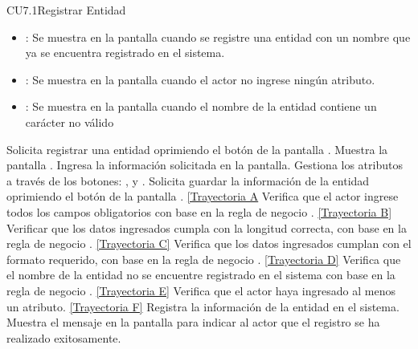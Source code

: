 \begin{UseCase}{CU7.1}{Registrar Entidad}
{\begin{itemize}
		\item {}: Se muestra en la pantalla  cuando se registre una entidad con un nombre que ya se encuentra registrado en el sistema.
		\item {}: Se muestra en la pantalla  cuando el actor no ingrese ningún atributo.
		\item {}: Se muestra en la pantalla  cuando el nombre de la entidad contiene un carácter no válido
		\end{itemize}
		}
	\end{UseCase}
	\begin{UCtrayectoria}
		\UCpaso[\UCactor] Solicita registrar una entidad oprimiendo el botón  de la pantalla .
		\UCpaso[\UCsist] Muestra la pantalla .
		\UCpaso[\UCactor] Ingresa la información solicitada en la pantalla. \label{CU7.1-P3}
		\UCpaso[\UCactor] Gestiona los atributos a través de los botones: , \editar y \eliminar. \label{CU7.1-P4}
		\UCpaso[\UCactor] Solicita guardar la información de la entidad oprimiendo el botón  de la pantalla . \hyperlink{CU7-1:TAA}{[Trayectoria A}
		\UCpaso[\UCsist] Verifica que el actor ingrese todos los campos obligatorios con base en la regla de negocio . \hyperlink{CU7-1:TAB}{[Trayectoria B]}
		\UCpaso[\UCsist] Verificar que los datos ingresados cumpla con la longitud correcta, con base en la regla de negocio . \hyperlink{CU7-1:TAC}{[Trayectoria C]}
		\UCpaso[\UCsist] Verifica que los datos ingresados cumplan con el formato requerido, con base en la regla de negocio . \hyperlink{CU7-1:TAD}{[Trayectoria D]}
		\UCpaso[\UCsist] Verifica que el nombre de la entidad no se encuentre registrado en el sistema con base en la regla de negocio . \hyperlink{CU7-1:TAE}{[Trayectoria E]}
		\UCpaso[\UCsist] Verifica que el actor haya ingresado al menos un atributo. \hyperlink{CU7-1:TAF}{[Trayectoria F]}
		\UCpaso[\UCsist] Registra la información de la entidad en el sistema.
		\UCpaso[\UCsist] Muestra el mensaje  en la pantalla  para indicar al actor que el registro se ha realizado exitosamente.
	\end{UCtrayectoria}		
